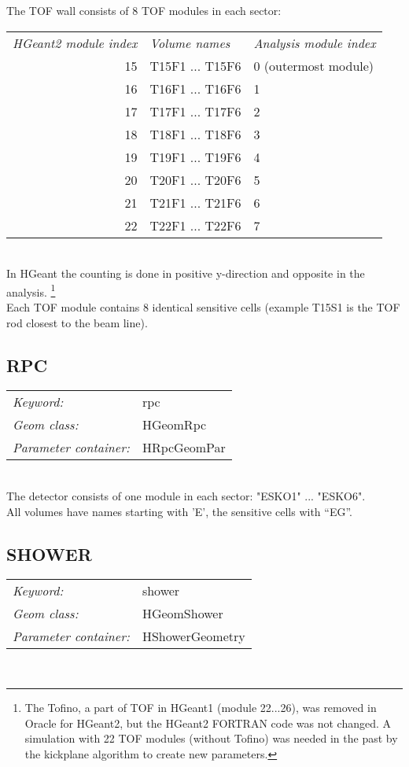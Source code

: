 The TOF wall consists of 8 TOF modules in each sector: \\
\begin{tabular}{rll}
  \textit{HGeant2 module index} & \textit{Volume names} & \textit{Analysis module index}\\
  15 & T15F1 ... T15F6 & 0 (outermost module)\\
  16 & T16F1 ... T16F6 & 1 \\
  17 & T17F1 ... T17F6 & 2 \\
  18 & T18F1 ... T18F6 & 3 \\
  19 & T19F1 ... T19F6 & 4 \\
  20 & T20F1 ... T20F6 & 5 \\
  21 & T21F1 ... T21F6 & 6 \\
  22 & T22F1 ... T22F6 & 7 \\
\end{tabular}\\
In HGeant the counting is done in positive y-direction and opposite in the analysis.
\footnote{The Tofino, a part of TOF in HGeant1 (module 22...26), was removed in Oracle for HGeant2, but the HGeant2 
FORTRAN code was not changed. A simulation with 22 TOF modules (without Tofino) was needed in the past by the kickplane 
algorithm to create new parameters.}\\
Each TOF module contains 8 identical sensitive cells (example T15S1 is the TOF rod closest to the beam line).

\subsection*{RPC}

\begin{tabular}{ll}
\emph{Keyword:}             & rpc \\
\emph{Geom class:}          & HGeomRpc \\
\emph{Parameter container:} & HRpcGeomPar 
\end{tabular}\\

The detector consists of one module in each sector: "ESKO1" ... "ESKO6". \\
All volumes have names starting with 'E', the sensitive cells with ``EG''. 

\subsection*{SHOWER}

\begin{tabular}{ll}
\emph{Keyword:}             & shower \\
\emph{Geom class:}          & HGeomShower \\
\emph{Parameter container:} & HShowerGeometry 
\end{tabular}\\

